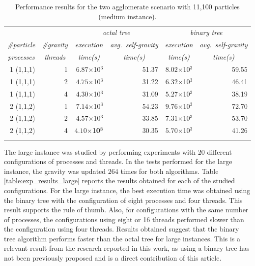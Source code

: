 \documentclass[runningheads]{llncs}
\begin{document}
\begin{table}[!t]
\small
\setlength{\belowcaptionskip}{3pt}
\centering
\caption{Performance results for the two agglomerate scenario with 11,100 particles (medium instance).}
\setlength{\tabcolsep}{4.75pt}
\begin{tabular}{r r r r r r}
    \toprule
        & & \multicolumn{2}{c}{\textit{octal tree}} & \multicolumn{2}{c}{\textit{binary tree}} \\
	\cmidrule(lr){3-4}\cmidrule(lr){5-6}
       \multicolumn{1}{c}{\textit{\#particle}} & \multicolumn{1}{c}{\textit{\#gravity}} & \multicolumn{1}{c}{\textit{execution}} & \multicolumn{1}{c}{\textit{avg.~self-gravity}} & \multicolumn{1}{c}{\textit{execution}} & \multicolumn{1}{c}{\textit{avg.~self-gravity}} \\
	\multicolumn{1}{c}{\textit{processes}} & \multicolumn{1}{c}{\textit{threads}} & \multicolumn{1}{c}{\textit{time(s)}} & \multicolumn{1}{c}{\textit{time(s)}} & \multicolumn{1}{c}{\textit{time(s)}} & \multicolumn{1}{c}{\textit{time(s)}}\\
  	\midrule
    1 (1,1,1) & 1 & $6.87$$\times$10$^3$ & 51.37 & $8.02$$\times$10$^3$ & 59.55\\
  	1 (1,1,1) & 2 & $4.75$$\times$10$^3$ & 31.22 & $6.32$$\times$10$^3$ & 46.41\\
  	1 (1,1,1) & 4 & $4.30$$\times$10$^3$ & 31.09 & $5.27$$\times$10$^3$ & 38.19\\
    2 (1,1,2) & 1 & $7.14$$\times$10$^3$ & 54.23 & $9.76$$\times$10$^3$ & 72.70\\
    2 (1,1,2) & 2 & $4.57$$\times$10$^3$ & 33.85 & $7.31$$\times$10$^3$ & 53.70\\
    2 (1,1,2) & 4 & $\boldsymbol{4.10}$$\boldsymbol{\times}$\textbf{10}$\boldsymbol{^3}$ & 30.35 & $5.70$$\times$10$^3$ & 41.26\\
    \bottomrule
    \\
\end{tabular}
\label{table:exp_results_medium}
\vspace{-0.5cm}
\end{table}

The large instance was studied by performing experiments with 20 different configurations of processes and threads. In the tests performed for the large instance, the gravity was updated 264 times for both algorithms. Table \ref{table:exp_results_large} reports the results obtained for each of the studied configurations. For the large instance, the best execution time was obtained using the binary tree with the configuration of eight processes and four threads. This result supports the rule of thumb. Also, for configurations with the same number of processes, the configurations using eight or 16 threads performed slower than the configuration using four threads. Results obtained suggest that the binary tree algorithm performs faster than the octal tree for large instances. This is a relevant result from the research reported in this work, as using a binary tree has not been previously proposed and is a direct contribution of this article.
\end{document}
